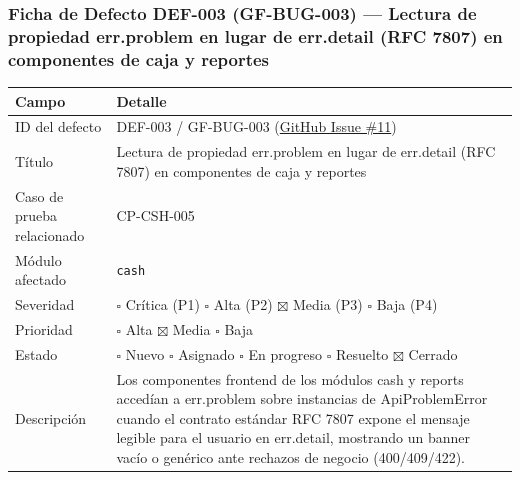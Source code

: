 \documentclass[10pt,a4paper]{article}
\newcounter{none}
\begin{document}
\endgroup\medskip


\subsubsection{Ficha de Defecto DEF-003 (GF-BUG-003) --- Lectura de propiedad err.problem en lugar de err.detail (RFC 7807) en componentes de caja y reportes}\label{ficha-de-defecto-def-003-gf-bug-003--lectura-de-propiedad-errproblem-en-lugar-de-errdetail-rfc-7807-en-componentes-de-caja-y-reportes}

\begingroup\singlespacing\footnotesize\setlength{\parskip}{0pt}

{\def\LTcaptype{none} %
\begin{longtable}[]{@{}
  >{\raggedright\arraybackslash}p{}
  >{\raggedright\arraybackslash}p{}@{}}
\toprule\noalign{}
\begin{minipage}[b]{\linewidth}\raggedright
Campo
\end{minipage} & \begin{minipage}[b]{\linewidth}\raggedright
Detalle
\end{minipage} \\
\midrule\noalign{}
\endhead
\bottomrule\noalign{}
\endlastfoot
ID del defecto & DEF-003 / GF-BUG-003 (\href{https://github.com/H3llz07/GastroForge-Testing/issues/11}{GitHub Issue \#11}) \\
Título & Lectura de propiedad err.problem en lugar de err.detail (RFC 7807) en componentes de caja y reportes \\
Caso de prueba relacionado & CP-CSH-005 \\
Módulo afectado & \texttt{cash} \\
Severidad & \ensuremath{\square} Crítica (P1) \ensuremath{\square} Alta (P2) \ensuremath{\boxtimes} Media (P3) \ensuremath{\square} Baja (P4) \\
Prioridad & \ensuremath{\square} Alta \ensuremath{\boxtimes} Media \ensuremath{\square} Baja \\
Estado & \ensuremath{\square} Nuevo \ensuremath{\square} Asignado \ensuremath{\square} En progreso \ensuremath{\square} Resuelto \ensuremath{\boxtimes} Cerrado \\
Descripción & Los componentes frontend de los módulos cash y reports accedían a err.problem sobre instancias de ApiProblemError cuando el contrato estándar RFC 7807 expone el mensaje legible para el usuario en err.detail, mostrando un banner vacío o genérico ante rechazos de negocio (400/409/422). \\

\end{longtable}}
\end{document}
